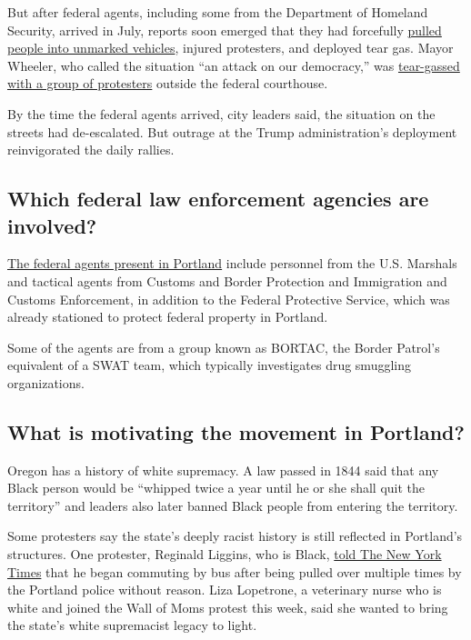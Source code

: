 But after federal agents, including some from the Department of Homeland
Security, arrived in July, reports soon emerged that they had forcefully
\href{https://www.nytimes.com/2020/07/20/us/politics/portland-federal-agents-trump.html}{pulled
people into unmarked vehicles}, injured protesters, and deployed tear
gas. Mayor Wheeler, who called the situation ``an attack on our
democracy,'' was
\href{https://www.nytimes.com/2020/07/23/us/portland-protest-tear-gas-mayor.html}{tear-gassed
with a group of protesters} outside the federal courthouse.

By the time the federal agents arrived, city leaders said, the situation
on the streets had de-escalated. But outrage at the Trump
administration's deployment reinvigorated the daily rallies.

\hypertarget{which-federal-law-enforcement-agencies-are-involved}{%
\subsection{Which federal law enforcement agencies are
involved?}\label{which-federal-law-enforcement-agencies-are-involved}}

\href{https://www.nytimes.com/2020/07/21/us/politics/homeland-security-portland-oregon.html}{The
federal agents present in Portland} include personnel from the U.S.
Marshals and tactical agents from Customs and Border Protection and
Immigration and Customs Enforcement, in addition to the Federal
Protective Service, which was already stationed to protect federal
property in Portland.

Some of the agents are from a group known as BORTAC, the Border Patrol's
equivalent of a SWAT team, which typically investigates drug smuggling
organizations.

\hypertarget{what-is-motivating-the-movement-in-portland}{%
\subsection{What is motivating the movement in
Portland?}\label{what-is-motivating-the-movement-in-portland}}

Oregon has a history of white supremacy. A law passed in 1844 said that
any Black person would be ``whipped twice a year until he or she shall
quit the territory'' and leaders also later banned Black people from
entering the territory.

Some protesters say the state's deeply racist history is still reflected
in Portland's structures. One protester, Reginald Liggins, who is Black,
\href{https://www.nytimes.com/2020/07/24/us/portland-oregon-protests-white-race.html}{told
The New York Times} that he began commuting by bus after being pulled
over multiple times by the Portland police without reason. Liza
Lopetrone, a veterinary nurse who is white and joined the Wall of Moms
protest this week, said she wanted to bring the state's white
supremacist legacy to light.

